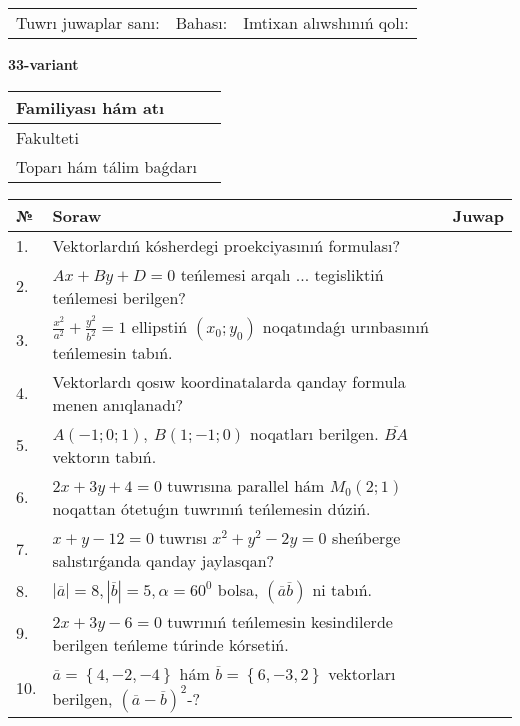 \documentclass{article}
\begin{document}
\vspace{1cm}

\begin{tabular}{lll}
Tuwrı juwaplar sanı: \underline{\hspace{1.5cm}} & 
Bahası: \underline{\hspace{1.5cm}} & 
Imtixan alıwshınıń qolı: \underline{\hspace{2cm}} \\
\end{tabular}

\egroup

\newpage


\textbf{33-variant}\\

\bgroup
\def\arraystretch{1.6} %

\begin{tabular}{|m{5.7cm}|m{9.5cm}|}
\hline
Familiyası hám atı & \\
\hline
Fakulteti  & \\
\hline
Toparı hám tálim baǵdarı  & \\
\hline
\end{tabular}

\vspace{1cm}

\begin{tabular}{|m{0.7cm}|m{10cm}|m{4cm}|}
\hline
№ & Soraw & Juwap \\
\hline
1. & Vektorlardıń kósherdegi proekciyasınıń formulası? &  \\
\hline
2. & $Ax+By+D=0$ teńlemesi arqalı ... tegisliktiń teńlemesi berilgen? &  \\
\hline
3. & $\frac{x^2}{a^2}+\frac{y^2}{b^2}=1$ ellipstiń $(x_0;y_0)$ noqatındaǵı urınbasınıń teńlemesin tabıń. &  \\
\hline
4. & Vektorlardı qosıw koordinatalarda qanday formula menen anıqlanadı? &  \\
\hline
5. & $A (-1;0;1),\ B (1;-1;0)$ noqatları berilgen. $\overline{BA}$ vektorın tabıń. &  \\
\hline
6. & $2x+3y+4=0$ tuwrısına parallel hám $M_{0} (2;1)$ noqattan ótetuǵın tuwrınıń teńlemesin dúziń. &  \\
\hline
7. & $x+y-12=0$ tuwrısı $x^{2}+y^{2}-2y=0$ sheńberge salıstırǵanda qanday jaylasqan? &  \\
\hline
8. & $\left| \overline{a} \right|=8, \left| \overline{b} \right|=5, \alpha=60^{0}$ bolsa, $( \overline{a}\overline{b} )$ ni tabıń. &  \\
\hline
9. & $2x+3y-6=0$ tuwrınıń teńlemesin kesindilerde berilgen teńleme túrinde kórsetiń. &  \\
\hline
10. & $\overline{a}=\left\{ 4,-2,-4 \right\}$ hám $\overline{b}=\left\{ 6,-3, 2 \right\}$ vektorları berilgen, $(\overline{a}-\overline{b}) ^{2}$-? &  \\
\hline
\end{tabular}
\end{document}

